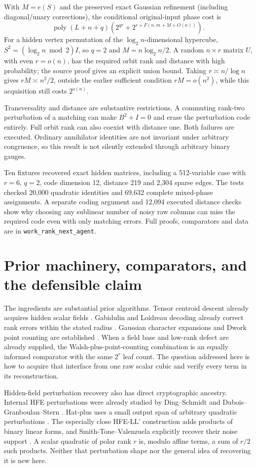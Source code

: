 \documentclass[11pt]{article}
\theoremstyle{remark}\newtheorem{remark}[theorem]{Remark}
\newcommand{\poly}{\operatorname{poly}}
\begin{document}
With $M=e(S)$ and the preserved exact Gaussian refinement (including diagonal/unary corrections), the conditional original-input phase cost is
\[
 \poly(L+n+q)\left(2^{qr}+2^{r+F(n,m+M+O(n))}\right).
\]
For a hidden vertex permutation of the $\log_2n$-dimensional hypercube, $S^2=(\log_2n\bmod2)I$, so $q=2$ and $M=n\log_2n/2$. A random $n\times r$ matrix $U$, with even $r=o(n)$, has the required orbit rank and distance with high probability; the source proof gives an explicit union bound. Taking $r\asymp n/\log n$ gives $rM\asymp n^2/2$, outside the earlier sufficient condition $rM=o(n^2)$, while this acquisition still costs $2^{o(n)}$.

Transversality and distance are substantive restrictions. A commuting rank-two perturbation of a matching can make $B^2+I=0$ and erase the perturbation code entirely. Full orbit rank can also coexist with distance one. Both failures are executed. Ordinary annihilator identities are not invariant under arbitrary congruence, so this result is not silently extended through arbitrary binary gauges.

Ten fixtures recovered exact hidden matrices, including a 512-variable case with $r=6$, $q=2$, code dimension 12, distance 219 and 2,304 sparse edges. The tests checked 20,000 quadratic identities and 69,632 complete mixed-phase assignments. A separate coding argument and 12,094 executed distance checks show why choosing any sublinear number of noisy raw columns can miss the required code even with only matching errors. Full proofs, comparators and data are in \texttt{work\_rank\_next\_agent}.

\section{Prior machinery, comparators, and the defensible claim}
The ingredients are substantial prior algorithms. Tensor centroid descent already acquires hidden scalar fields \cite{magma}. Gabidulin and Loidreau decoding already correct rank errors within the stated radius \cite{silva,bombar}. Gaussian character expansions and Dwork point counting are established \cite{lauderwan}. When a field base and low-rank defect are already supplied, the Walsh-plus-point-counting combination is an equally informed comparator with the same $2^r$ leaf count. The question addressed here is how to acquire that interface from one raw scalar cubic and verify every term in its reconstruction.

Hidden-field perturbation recovery also has direct cryptographic ancestry. Internal HFE perturbations were already studied by Ding--Schmidt and Dubois--Granboulan--Stern \cite{ding,dubois}. Hat-plus uses a small output span of arbitrary quadratic perturbations \cite{hat}. The especially close HFE-LL' construction adds products of binary linear forms, and Smith-Tone--Valenzuela explicitly recover their noise support \cite{llprime}. A scalar quadratic of polar rank $r$ is, modulo affine terms, a sum of $r/2$ such products. Neither that perturbation shape nor the general idea of recovering it is new here.
\end{document}
